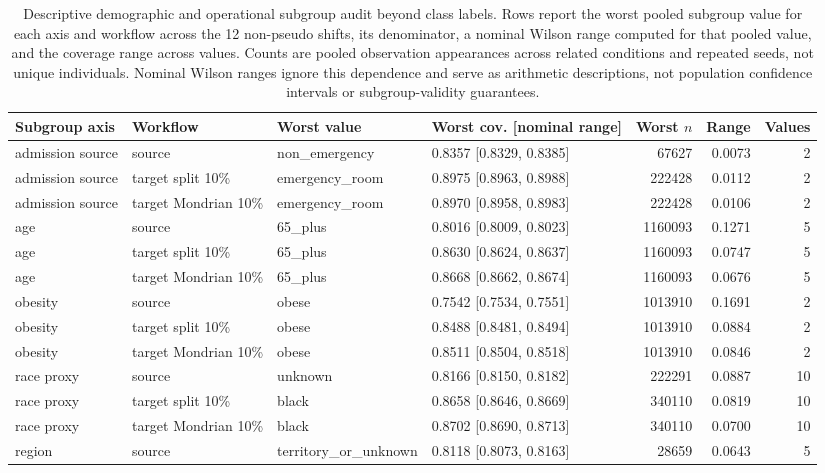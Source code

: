 \begin{table}[!tbp]
\centering
\caption{Descriptive demographic and operational subgroup audit beyond class labels. Rows report the worst pooled subgroup value for each axis and workflow across the 12 non-pseudo shifts, its denominator, a nominal Wilson range computed for that pooled value, and the coverage range across values. Counts are pooled observation appearances across related conditions and repeated seeds, not unique individuals. Nominal Wilson ranges ignore this dependence and serve as arithmetic descriptions, not population confidence intervals or subgroup-validity guarantees.}
\label{primary-tab:demographic_subgroup_audit}
\scriptsize
\setlength{\tabcolsep}{2.5pt}
\renewcommand{\arraystretch}{1.08}
\begin{tabularx}{\textwidth}{@{}L{2.0cm}L{2.35cm}L{2.8cm}L{2.7cm}rrr@{}}
\toprule
Subgroup axis & Workflow & Worst value & Worst cov. [nominal range] & Worst $n$ & Range & Values \\
\midrule
admission source & source & non\_emergency & 0.8357 [0.8329, 0.8385] & 67627 & 0.0073 & 2 \\
admission source & target split 10\% & emergency\_room & 0.8975 [0.8963, 0.8988] & 222428 & 0.0112 & 2 \\
admission source & target Mondrian 10\% & emergency\_room & 0.8970 [0.8958, 0.8983] & 222428 & 0.0106 & 2 \\
age & source & 65\_plus & 0.8016 [0.8009, 0.8023] & 1160093 & 0.1271 & 5 \\
age & target split 10\% & 65\_plus & 0.8630 [0.8624, 0.8637] & 1160093 & 0.0747 & 5 \\
age & target Mondrian 10\% & 65\_plus & 0.8668 [0.8662, 0.8674] & 1160093 & 0.0676 & 5 \\
obesity & source & obese & 0.7542 [0.7534, 0.7551] & 1013910 & 0.1691 & 2 \\
obesity & target split 10\% & obese & 0.8488 [0.8481, 0.8494] & 1013910 & 0.0884 & 2 \\
obesity & target Mondrian 10\% & obese & 0.8511 [0.8504, 0.8518] & 1013910 & 0.0846 & 2 \\
race proxy & source & unknown & 0.8166 [0.8150, 0.8182] & 222291 & 0.0887 & 10 \\
race proxy & target split 10\% & black & 0.8658 [0.8646, 0.8669] & 340110 & 0.0819 & 10 \\
race proxy & target Mondrian 10\% & black & 0.8702 [0.8690, 0.8713] & 340110 & 0.0700 & 10 \\
region & source & territory\_or\_unknown & 0.8118 [0.8073, 0.8163] & 28659 & 0.0643 & 5 \\

\end{tabularx}
\end{table}
